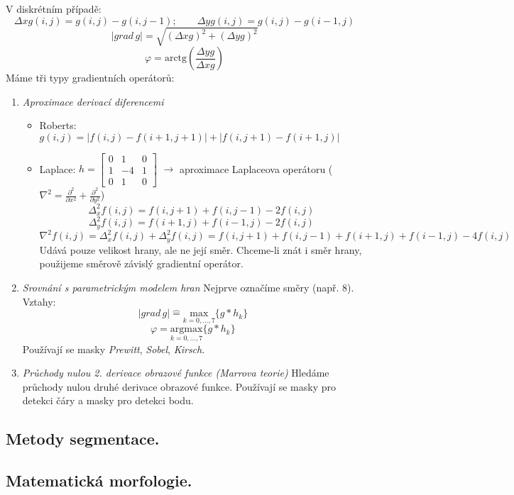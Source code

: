 V diskrétním případě:
\begin{equation}
\Delta xg(i,j) = g(i, j) - g(i,j-1); \qquad \Delta yg(i,j) = g(i, j) - g(i-1,j)
\end{equation}
\begin{equation}
|grad \, g| = \sqrt{(\Delta xg)^2 + (\Delta yg)^2}
\end{equation}
\begin{equation}
\varphi = \mathrm{arctg} \left( \frac{\Delta yg}{\Delta xg} \right)
\end{equation}
Máme tři typy gradientních operátorů:
\begin{enumerate}
\item \textit{Aproximace derivací diferencemi}
\begin{itemize}
\item Roberts: $ g(i,j) = |f(i,j)-f(i+1,j+1)| + |f(i,j+1)-f(i+1,j)| $
\item Laplace: $ h = \begin{bmatrix}
0 & 1 & 0 \\ 1 & -4 & 1 \\ 0 & 1 & 0
\end{bmatrix} $
$ \to $ aproximace Laplaceova operátoru ($ \nabla^2 = \frac{\partial^2}{\partial x^2} + \frac{\partial^2}{\partial y^2} $)
\begin{equation}
\Delta_x^2 f(i,j) = f(i,j+1) + f(i,j-1) - 2f(i,j)
\end{equation}
\begin{equation}
\Delta_y^2 f(i,j) = f(i+1,j) + f(i-1,j) - 2f(i,j)
\end{equation}
\begin{equation*}
\nabla^2 f(i,j) = \Delta_x^2 f(i,j) + \Delta_y^2 f(i,j) = f(i,j+1) + f(i,j-1) + f(i+1,j) + f(i-1,j) - 4f(i,j)
\end{equation*}
Udává pouze velikost hrany, ale ne její směr. Chceme-li znát i směr hrany, použijeme směrově závislý gradientní operátor.
\end{itemize}
\item \textit{Srovnání s parametrickým modelem hran}
Nejprve označíme směry (např. 8). Vztahy:
\begin{equation}
|grad \, g| \hat{=} \underset{k=0,...,7}{\mathrm{max}}\{ g * h_k \}
\end{equation}
\begin{equation}
\varphi = \underset{k=0,...,7}{\mathrm{argmax}}\{ g * h_k \}
\end{equation}
Používají se masky \textit{Prewitt}, \textit{Sobel}, \textit{Kirsch}.

\item \textit{Průchody nulou 2. derivace obrazové funkce (Marrova teorie)}
Hledáme průchody nulou druhé derivace obrazové funkce. Používají se masky pro detekci čáry a masky pro detekci bodu.
\vspace{3cm}
\end{enumerate}

\subsection{Metody segmentace.}

\subsection{Matematická morfologie.}